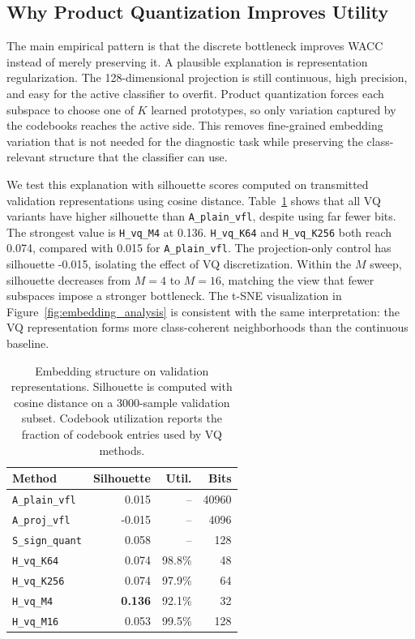 \documentclass{article}
\begin{document}
\subsection{Why Product Quantization Improves Utility}

The main empirical pattern is that the discrete bottleneck improves WACC instead of merely preserving it. A plausible explanation is representation regularization. The 128-dimensional projection is still continuous, high precision, and easy for the active classifier to overfit. Product quantization forces each subspace to choose one of $K$ learned prototypes, so only variation captured by the codebooks reaches the active side. This removes fine-grained embedding variation that is not needed for the diagnostic task while preserving the class-relevant structure that the classifier can use.

We test this explanation with silhouette scores \citep{rousseeuw1987silhouettes} computed on transmitted validation representations using cosine distance. Table~\ref{tab:silhouette} shows that all VQ variants have higher silhouette than \texttt{A\_plain\_vfl}, despite using far fewer bits. The strongest value is \texttt{H\_vq\_M4} at 0.136. \texttt{H\_vq\_K64} and \texttt{H\_vq\_K256} both reach 0.074, compared with 0.015 for \texttt{A\_plain\_vfl}. The projection-only control has silhouette -0.015, isolating the effect of VQ discretization. Within the $M$ sweep, silhouette decreases from $M=4$ to $M=16$, matching the view that fewer subspaces impose a stronger bottleneck. The t-SNE visualization \citep{vandermaaten2008tsne} in Figure~\ref{fig:embedding_analysis} is consistent with the same interpretation: the VQ representation forms more class-coherent neighborhoods than the continuous baseline.

\begin{table}[t]
\caption{Embedding structure on validation representations. Silhouette is computed with cosine distance on a 3000-sample validation subset. Codebook utilization reports the fraction of codebook entries used by VQ methods.}
\label{tab:silhouette}
\centering
\small
\setlength{\tabcolsep}{4pt}
\begin{tabular}{lrrr}
\toprule
Method & Silhouette & Util. & Bits \\
\midrule
\texttt{A\_plain\_vfl} & 0.015 & -- & 40960 \\
\texttt{A\_proj\_vfl} & -0.015 & -- & 4096 \\
\texttt{S\_sign\_quant} & 0.058 & -- & 128 \\
\texttt{H\_vq\_K64} & 0.074 & 98.8\% & 48 \\
\texttt{H\_vq\_K256} & 0.074 & 97.9\% & 64 \\
\texttt{H\_vq\_M4} & \textbf{0.136} & 92.1\% & 32 \\
\texttt{H\_vq\_M16} & 0.053 & 99.5\% & 128 \\
\bottomrule
\end{tabular}
\end{table}
\end{document}
